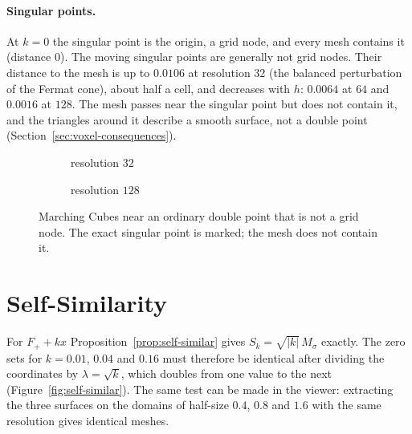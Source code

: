 \paragraph{Singular points.} At $k=0$ the singular point is the origin, a grid
node, and every mesh contains it (distance $0$). The moving singular points
are generally not grid nodes. Their distance to the mesh is up to $0.0106$ at
resolution $32$ (the balanced perturbation of the Fermat cone), about half a
cell, and decreases with $h$: $0.0064$ at $64$ and $0.0016$ at $128$. The mesh
passes near the singular point but does not contain it, and the triangles
around it describe a smooth surface, not a double point
(Section~\ref{sec:voxel-consequences}).

\begin{figure}[!h]
    \centering
    \begin{subfigure}{0.47\textwidth}\centering
        \caption{resolution $32$}\end{subfigure}\hfill
    \begin{subfigure}{0.47\textwidth}\centering
        \caption{resolution $128$}\end{subfigure}
    \caption[Mesh near a moving singular point]{Marching Cubes near an ordinary
    double point that is not a grid node. The exact singular point is marked;
    the mesh does not contain it.}
    \label{fig:mesh-singular}
\end{figure}

\section{Self-Similarity}
\label{sec:exp-self-similarity}

For $F_++kx$ Proposition~\ref{prop:self-similar} gives $S_k=\sqrt{|k|}\,M_\sigma$
exactly. The zero sets for $k=0.01$, $0.04$ and $0.16$ must therefore be identical after
dividing the coordinates by $\lambda=\sqrt k$, which doubles from one value to
the next (Figure~\ref{fig:self-similar}). The same test can be made in the
viewer: extracting the three surfaces on the domains of half-size $0.4$, $0.8$
and $1.6$ with the same resolution gives identical meshes.

